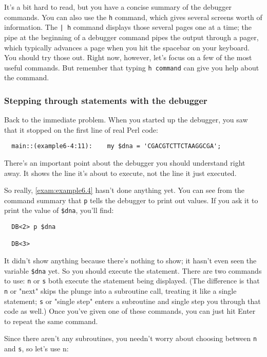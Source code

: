 It's a bit hard to read, but you have a concise summary of the debugger commands. You can also use the \verb|h| command, which gives several screens worth of information. The \verb=| h= command displays those several pages one at a time; the pipe at the beginning of a debugger command pipes the output through a pager, which typically advances a page when you hit the spacebar on your keyboard. You should try those out. Right now, however, let's focus on a few of the most useful commands. But remember that typing \verb|h command| can give you help about the command. 

\subsubsection{Stepping through statements with the debugger}
Back to the immediate problem. When you started up the debugger, you saw that it stopped on the first line of real Perl code:

\begin{lstlisting}
  main::(example6-4:11):    my $dna = 'CGACGTCTTCTAAGGCGA';
\end{lstlisting}

There's an important point about the debugger you should understand right away. It shows the line it's about to execute, not the line it just executed.

So really, \autoref{exam:example6.4} hasn't done anything yet. You can see from the command summary that \verb|p| tells the debugger to print out values. If you ask it to print the value of \verb|$dna|, you'll find:

\begin{lstlisting}
  DB<2> p $dna

  DB<3> 
\end{lstlisting}

It didn't show anything because there's nothing to show; it hasn't even seen the variable \verb|$dna| yet. So you should execute the statement. There are two commands to use: \verb|n| or \verb|s| both execute the statement being displayed. (The difference is that \verb|n| or "next" skips the plunge into a subroutine call, treating it like a single statement; \verb|s| or "single step" enters a subroutine and single step you through that code as well.) Once you've given one of these commands, you can just hit Enter to repeat the same command.

Since there aren't any subroutines, you needn't worry about choosing between \verb|n| and \verb|s|, so let's use n: 

